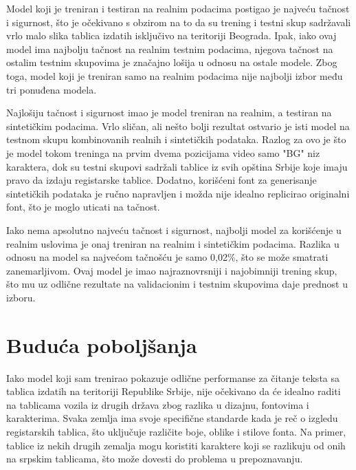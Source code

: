 \documentclass[a4paper,12pt]{article}
\begin{document}
	Model koji je treniran i testiran na realnim podacima postigao je najveću tačnost i sigurnost, što je očekivano s obzirom na to da su trening i testni skup sadržavali vrlo malo slika tablica izdatih isključivo na teritoriji Beograda. Ipak, iako ovaj model ima najbolju tačnost na realnim testnim podacima, njegova tačnost na ostalim testnim skupovima je značajno lošija u odnosu na ostale modele. Zbog toga, model koji je treniran samo na realnim podacima nije najbolji izbor među tri ponuđena modela.
	
	Najlošiju tačnost i sigurnost imao je model treniran na realnim, a testiran na sintetičkim podacima. Vrlo sličan, ali nešto bolji rezultat ostvario je isti model na testnom skupu kombinovanih realnih i sintetičkih podataka. Razlog za ovo je što je model tokom treninga na prvim dvema pozicijama video samo "BG" niz karaktera, dok su testni skupovi sadržali tablice iz svih opština Srbije koje imaju pravo da izdaju registarske tablice. Dodatno, korišćeni font za generisanje sintetičkih podataka je ručno napravljen i možda nije idealno replicirao originalni font, što je moglo uticati na tačnost.
	
	Iako nema apsolutno najveću tačnost i sigurnost, najbolji model za korišćenje u realnim uslovima je onaj treniran na realnim i sintetičkim podacima. Razlika u odnosu na model sa najvećom tačnošću je samo 0,02\%, što se može smatrati zanemarljivom. Ovaj model je imao najraznovrsniji i najobimniji trening skup, što mu uz odlične rezultate na validacionim i testnim skupovima daje prednost u izboru.
	\newpage
	
	\section{Buduća poboljšanja}
	Iako model koji sam trenirao pokazuje odlične performanse za čitanje teksta sa tablica izdatih na teritoriji Republike Srbije, nije očekivano da će idealno raditi na tablicama vozila iz drugih država zbog razlika u dizajnu, fontovima i karakterima. Svaka zemlja ima svoje specifične standarde kada je reč o izgledu registarskih tablica, što uključuje različite boje, oblike i stilove fonta. Na primer, tablice iz nekih drugih zemalja mogu koristiti karaktere koji se razlikuju od onih na srpskim tablicama, što može dovesti do problema u prepoznavanju.
	
\end{document}
